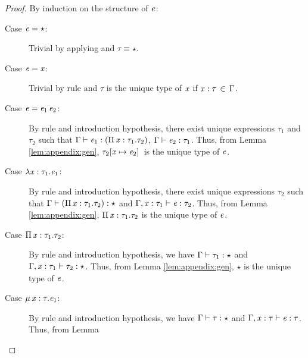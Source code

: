 \begin{proof}
	By induction on the structure of $\mathit{e}$:
	\begin{description}
	    \item[Case $\mathit{e}  =  \star$:] Trivial by applying  and $\tau  \equiv  \star$.
		\item[Case $\mathit{e}  =  \mathit{x}$:] Trivial by rule  and $\tau$ is the
unique type of $\mathit{x}$ if $\mathit{x}  :  \tau \, \in \, \Gamma$.
		\item[Case $\mathit{e}=\mathit{e_{{\mathrm{1}}}} \, \mathit{e_{{\mathrm{2}}}}$:] By rule  and introduction
hypothesis, there exist unique expressions $\tau_{{\mathrm{1}}}$ and $\tau_{{\mathrm{2}}}$ such that $\Gamma  \vdash  \mathit{e_{{\mathrm{1}}}}  :  (  \Pi \, \mathit{x}  :  \tau_{{\mathrm{1}}}  .  \tau_{{\mathrm{2}}}  )$, $\Gamma  \vdash  \mathit{e_{{\mathrm{2}}}}  :  \tau_{{\mathrm{1}}}$. Thus, from Lemma
\ref{lem:appendix:gen}, $\tau_{{\mathrm{2}}}  [  \mathit{x}  \mapsto  \mathit{e_{{\mathrm{2}}}}  ] \,$ is the unique type of $\mathit{e}$.
		\item[Case $\lambda  \mathit{x}  :  \tau_{{\mathrm{1}}}  .  \mathit{e_{{\mathrm{1}}}}$:] By rule  and introduction
hypothesis, there exist unique expressions $\tau_{{\mathrm{2}}}$ such that $\Gamma  \vdash  (  \Pi \, \mathit{x}  :  \tau_{{\mathrm{1}}}  .  \tau_{{\mathrm{2}}}  )  :  \star$ and $\Gamma  ,  \mathit{x}  :  \tau_{{\mathrm{1}}}  \vdash  \mathit{e}  :  \tau_{{\mathrm{2}}}$. Thus, from Lemma
\ref{lem:appendix:gen}, $\Pi \, \mathit{x}  :  \tau_{{\mathrm{1}}}  .  \tau_{{\mathrm{2}}}$ is the unique type of $\mathit{e}$.
		\item[Case $\Pi \, \mathit{x}  :  \tau_{{\mathrm{1}}}  .  \tau_{{\mathrm{2}}}$:] By rule  and introduction
hypothesis, we have $\Gamma  \vdash  \tau_{{\mathrm{1}}}  :  \star$ and $\Gamma  ,  \mathit{x}  :  \tau_{{\mathrm{1}}}  \vdash  \tau_{{\mathrm{2}}}  :  \star$. Thus, from Lemma
\ref{lem:appendix:gen}, $\star$ is the unique type of $\mathit{e}$.
		\item[Case $\mu \, \mathit{x}  :  \tau  .  \mathit{e_{{\mathrm{1}}}}$:] By rule  and introduction
hypothesis, we have $\Gamma  \vdash  \tau  :  \star$ and $\Gamma  ,  \mathit{x}  :  \tau  \vdash  \mathit{e}  :  \tau$. Thus, from Lemma

\end{description}
\end{proof}
